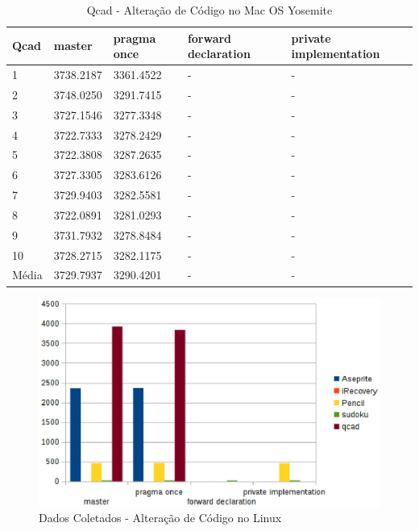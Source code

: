 \begin{table}[!h]
\centering
\caption{Qcad - Alteração de Código no Mac OS Yosemite}
\label{tab:alteracao_de_codigo:mac:qcad}
\begin{tabular}{lllll}
\textbf{Qcad} & \textbf{master} & \textbf{pragma once}  & \textbf{forward declaration} & \textbf{private implementation}   \\ \toprule
1                        &   3738.2187      &  3361.4522 &  -   & - \\ 
2                        &   3748.0250      &  3291.7415 &  -   & - \\ 
3                        &   3727.1546      &  3277.3348 &  -   & - \\ 
4                        &   3722.7333      &  3278.2429 &  -   & - \\ 
5                        &   3722.3808      &  3287.2635  &  -   & - \\ 
6                        &   3727.3305      &  3283.6126 &  -   & - \\ 
7                        &   3729.9403      &  3282.5581 &  -   & - \\ 
8                        &   3722.0891      &  3281.0293  &  -   & - \\ 
9                        &   3731.7932      &  3278.8484 &  -   & - \\ 
10                       &   3728.2715      &  3282.1175 &  -   & - \\ \bottomrule
Média                    &   3729.7937      &  3290.4201 &  -   & - \\ 
\end{tabular}
\end{table}

\begin{figure}[b]
    \centering
        \includegraphics{figuras/graficos/linux_alteracao_codigo.eps}
    \caption{Dados Coletados - Alteração de Código no Linux}
    \label{benchmark_guardas_de_inclusao}
\end{figure}

